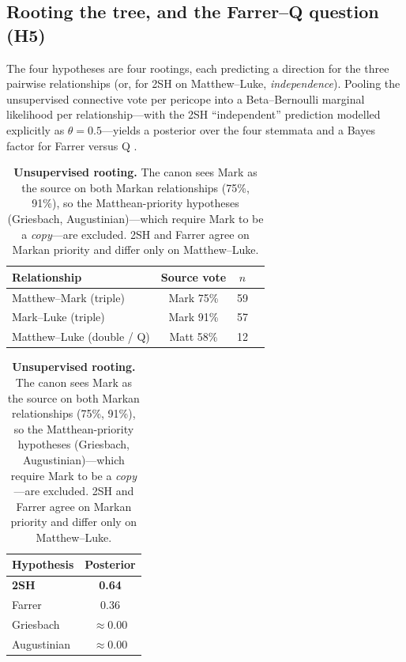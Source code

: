 \documentclass[11pt,letterpaper]{article}
\newcommand{\tblhead}{\rowcolor{marine!12}}
\begin{document}
\subsection{Rooting the tree, and the Farrer--Q question (H5)}

The four hypotheses are four rootings, each predicting a direction for the three pairwise
relationships (or, for 2SH on Matthew--Luke, \textit{independence}). Pooling the unsupervised
connective vote per pericope into a Beta--Bernoulli marginal likelihood per relationship---with
the 2SH ``independent'' prediction modelled explicitly as $\theta=0.5$---yields a posterior over
the four stemmata and a Bayes factor for Farrer versus Q \citep{kass1995}.

\begin{table}[H]
\centering
\small
\begin{minipage}[t]{0.54\linewidth}
\centering
\begin{tabular}{lccc}
\toprule
\tblhead\textbf{Relationship} & \textbf{Source vote} & \textbf{$n$} \\
\midrule
Matthew--Mark (triple) & Mark 75\% & 59 \\
Mark--Luke (triple) & Mark 91\% & 57 \\
Matthew--Luke (double / Q) & Matt 58\% & 12 \\
\bottomrule
\end{tabular}
\end{minipage}\hfill
\begin{minipage}[t]{0.42\linewidth}
\centering
\begin{tabular}{lc}
\toprule
\tblhead\textbf{Hypothesis} & \textbf{Posterior} \\
\midrule
\rowcolor{terracotta!12}\textbf{2SH} & \textbf{0.64} \\
Farrer & 0.36 \\
Griesbach & $\approx 0.00$ \\
Augustinian & $\approx 0.00$ \\
\bottomrule
\end{tabular}
\end{minipage}
\caption{\textbf{Unsupervised rooting.} The canon sees Mark as the source on both Markan
relationships (75\%, 91\%), so the Matthean-priority hypotheses (Griesbach, Augustinian)---which
require Mark to be a \textit{copy}---are excluded. 2SH and Farrer agree on Markan priority and
differ only on Matthew--Luke.}
\label{tab:rooting}
\end{table}
\end{document}
